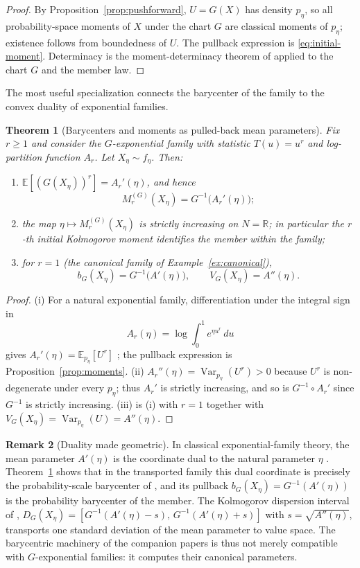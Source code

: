 \documentclass[11pt]{article}
\newtheorem{theorem}{Theorem}[section]
\theoremstyle{definition}
\newtheorem{remark}[theorem]{Remark}
\newcommand{\E}{\mathbb{E}}
\newcommand{\R}{\mathbb{R}}
\newcommand{\Var}{\operatorname{Var}}
\begin{document}
\begin{proof}
By Proposition~\ref{prop:pushforward}, $U=G(X)$ has density $p_\eta$, so
all probability-space moments of $X$ under the chart $G$ are classical
moments of $p_\eta$; existence follows from boundedness of $U$. The
pullback expression is \eqref{eq:initial-moment}. Determinacy is the
moment-determinacy theorem of \cite{Cojocea2026a} applied to the chart $G$
and the member law.
\end{proof}

The most useful specialization connects the barycenter of the family to
the convex duality of exponential families.

\begin{theorem}[Barycenters and moments as pulled-back mean parameters]
\label{thm:duality}
Fix $r\ge1$ and consider the $G$-exponential family with statistic
$T(u)=u^r$ and log-partition function $A_r$. Let $X_\eta\sim f_\eta$.
Then:
\begin{enumerate}[label=\textup{(\roman*)}]
\item $\E[(G(X_\eta))^r]=A_r'(\eta)$, and hence
\[
M_r^{(G)}(X_\eta)=G^{-1}\bigl(A_r'(\eta)\bigr);
\]
\item the map $\eta\mapsto M_r^{(G)}(X_\eta)$ is strictly increasing on
$N=\R$; in particular the $r$-th initial Kolmogorov moment identifies the
member within the family;
\item for $r=1$ (the canonical family of Example~\ref{ex:canonical}),
\[
b_G(X_\eta)=G^{-1}\bigl(A'(\eta)\bigr),
\qquad
V_G(X_\eta)=A''(\eta).
\]
\end{enumerate}
\end{theorem}

\begin{proof}
(i) For a natural exponential family, differentiation under the integral
sign in
\[
A_r(\eta)=\log\int_0^1 e^{\eta u^r}\,du
\]
gives
$A_r'(\eta)=\E_{p_\eta}[U^r]$ \cite{Brown1986}; the pullback expression is
Proposition~\ref{prop:moments}.
(ii) $A_r''(\eta)=\Var_{p_\eta}(U^r)>0$ because $U^r$ is non-degenerate
under every $p_\eta$; thus $A_r'$ is strictly increasing, and so is
$G^{-1}\circ A_r'$ since $G^{-1}$ is strictly increasing.
(iii) is (i) with $r=1$ together with
$V_G(X_\eta)=\Var_{p_\eta}(U)=A''(\eta)$.
\end{proof}

\begin{remark}[Duality made geometric]
In classical exponential-family theory, the mean parameter $A'(\eta)$ is
the coordinate dual to the natural parameter $\eta$
\cite{BarndorffNielsen1978,Brown1986,Amari2016}. Theorem~\ref{thm:duality}
shows that in the transported family this dual coordinate is precisely the
probability-scale barycenter of \cite{Cojocea2026a}, and its pullback
$b_G(X_\eta)=G^{-1}(A'(\eta))$ is the probability barycenter of the
member. The Kolmogorov dispersion interval of \cite{Cojocea2026a},
$D_G(X_\eta)=[G^{-1}(A'(\eta)-s),\,G^{-1}(A'(\eta)+s)]$ with
$s=\sqrt{A''(\eta)}$, transports one standard deviation of the mean
parameter to value space. The barycentric machinery of the companion
papers is thus not merely compatible with $G$-exponential families: it
computes their canonical parameters.
\end{remark}
\end{document}
